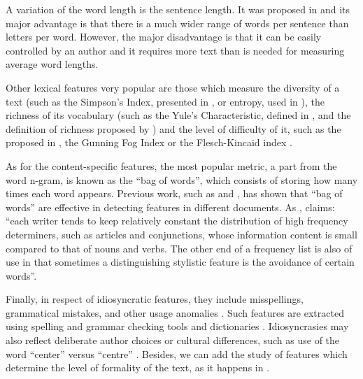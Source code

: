 A variation of the word length is the sentence length. It was proposed in \cite{yule1939sentence} and its major advantage is that there is a much wider range of words per sentence than letters per word. However, the major disadvantage is that it can be easily controlled by an author and it requires more text than is needed for measuring average word lengths.

Other lexical features very popular are those which measure the diversity of a text (such as the Simpson's Index, presented in \cite{simpson1949measurement}, or entropy, used in \cite{holmes1985analysis}), the richness of its vocabulary (such as the Yule's Characteristic, defined in \cite{yule2014statistical}, and the definition of richness proposed by \cite{honore1979some}) and the level of difficulty of it, such as the proposed in \cite{dale1948formula}, the Gunning Fog Index \citep{wiki:gunning} or the Flesch-Kincaid index \citep{dubay2004principles}.

As for the content-specific features, the most popular metric, a part from the word n-gram, is known as the ``bag of words'', which consists of storing how many times each word appears. Previous work, such as \cite{mihalcea2009lie} and \cite{ott2011finding}, has shown that ``bag of words'' are effective in detecting features in different documents. As \cite{allen1974methods}, claims: ``each writer tends to keep relatively constant the distribution of high frequency determiners, such as articles and conjunctions, whose information content is small compared to that of nouns and verbs. The other end of a frequency list is also of use in that sometimes a distinguishing stylistic feature is the avoidance of certain words''.

Finally, in respect of idiosyncratic features, they include misspellings, grammatical mistakes, and other usage anomalies \citep{abbasi2008writeprints}. Such features are extracted using spelling and grammar checking tools and dictionaries \citep{chaski2001empirical}. Idiosyncrasies may also reflect deliberate author choices or cultural differences, such as use of the word ``center'' versus ``centre'' \citep{koppel2003exploiting}. Besides, we can add the study of features which determine the level of formality of the text, as it happens in \cite{sheika2012learning}.